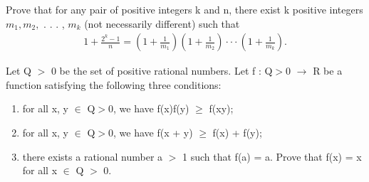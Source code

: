 \item Prove that for any pair of positive integers k and n, there exist k positive integers $m_1, m_2,$ . . . , $m_k$ (not necessarily different) such that
\begin{align*}
1 + \frac{2^k - 1}{n} = (1 +\frac{1}{m_1}) (1 + \frac{1}{m_2}) · · · (1 +\frac{1}{m_k}).
\end{align*}

\item Let Q $>$ 0 be the set of positive rational numbers. Let f : Q$>$0 $\to$ R be a function satisfying the following three conditions:
\begin{enumerate}
\item for all x, y $\in$ Q$>$0, we have f(x)f(y) $\geq$ f(xy);
\item for all x, y $\in$ Q$>$0, we have f(x + y) $\geq$ f(x) + f(y);
\item there exists a rational number a $>$ 1 such that f(a) = a.
Prove that f(x) = x for all x $\in$ Q $>$ 0.
\end{enumerate}